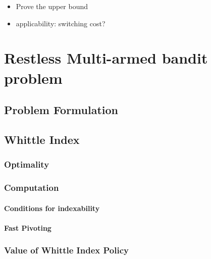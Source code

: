 \begin{itemize}
    \item Prove the upper bound
    \item applicability: switching cost?
\end{itemize}

\section{Restless Multi-armed bandit problem}
\label{sec:restless_mab_pb}

\subsection{Problem Formulation}
\label{subsec:restless_pb_formul}

\subsection{Whittle Index}
\label{subsec:whittle_idx}

\subsubsection{Optimality}

\subsubsection{Computation}

\paragraph{Conditions for indexability}

\paragraph{Fast Pivoting}

\subsubsection{Value of Whittle Index Policy}

